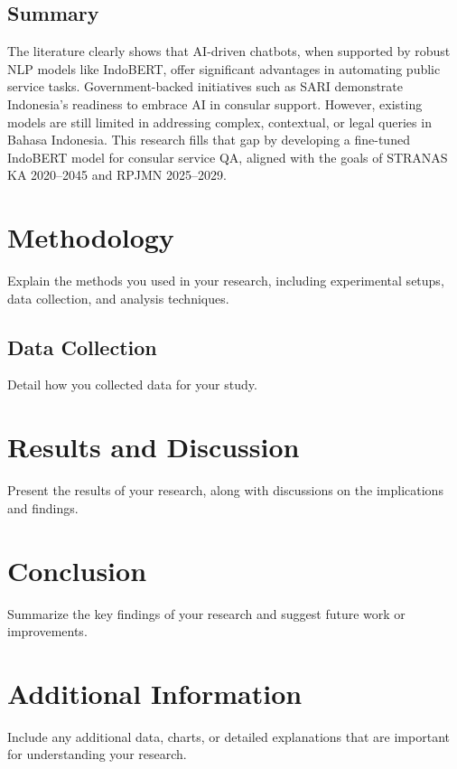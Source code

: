 \documentclass[a4paper,12pt]{report}
\begin{document}
\section{Summary}
The literature clearly shows that AI-driven chatbots, when supported by robust NLP models like IndoBERT, offer significant advantages in automating public service tasks. Government-backed initiatives such as SARI demonstrate Indonesia’s readiness to embrace AI in consular support. However, existing models are still limited in addressing complex, contextual, or legal queries in Bahasa Indonesia. This research fills that gap by developing a fine-tuned IndoBERT model for consular service QA, aligned with the goals of STRANAS KA 2020–2045 and RPJMN 2025–2029.


\newpage

\chapter{Methodology}
Explain the methods you used in your research, including experimental setups, data collection, and analysis techniques.

\section{Data Collection}
Detail how you collected data for your study.

\newpage

\chapter{Results and Discussion}
Present the results of your research, along with discussions on the implications and findings.

\newpage

\chapter{Conclusion}
Summarize the key findings of your research and suggest future work or improvements.

\newpage
% 
\printbibliography


\newpage

\appendix
\chapter{Additional Information}
Include any additional data, charts, or detailed explanations that are important for understanding your research.
\end{document}
